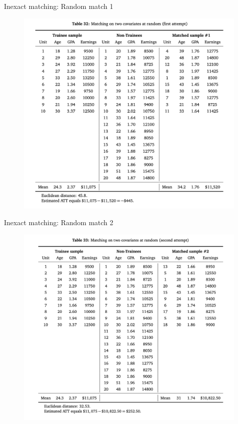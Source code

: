 \documentclass{beamer}
\begin{document}
\begin{frame}{Inexact matching: Random match 1}

\begin{figure}[!t]\centering
\includegraphics[scale=0.45]{./lecture_includes/inexact_random1}
\end{figure}

\end{frame}


\begin{frame}{Inexact matching: Random match 2}

\begin{figure}[!t]\centering
\includegraphics[scale=0.45]{./lecture_includes/inexact_random2}
\end{figure}

\end{frame}
\end{document}
